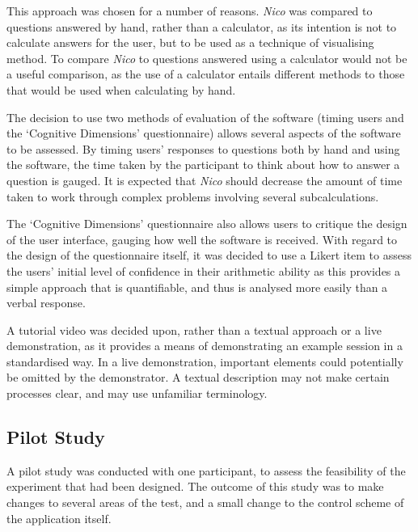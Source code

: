 \documentclass[12pt,twoside,notitlepage,xetex]{report}
\begin{document}
This approach was chosen for a number of reasons.  \emph{Nico} was compared to questions answered by hand, rather than a calculator, as its intention is not to calculate answers for the user, but to be used as a technique of visualising method.  To compare \emph{Nico} to questions answered using a calculator would not be a useful comparison, as the use of a calculator entails different methods to those that would be used when calculating by hand.

The decision to use two methods of evaluation of the software (timing users and the `Cognitive Dimensions' questionnaire) allows several aspects of the software to be assessed.  By timing users' responses to questions both by hand and using the software, the time taken by the participant to think about how to answer a question is gauged.  It is expected that \emph{Nico} should decrease the amount of time taken to work through complex problems involving several subcalculations.

The `Cognitive Dimensions' questionnaire also allows users to critique the design of the user interface, gauging how well the software is received.  With regard to the design of the questionnaire itself, it was decided to use a Likert item to assess the users' initial level of confidence in their arithmetic ability as this provides a simple approach that is quantifiable, and thus is analysed more easily than a verbal response.

A tutorial video was decided upon, rather than a textual approach or a live demonstration, as it provides a means of demonstrating an example session in a standardised way.  In a live demonstration, important elements could potentially be omitted by the demonstrator.  A textual description may not make certain processes clear, and may use unfamiliar terminology.

\subsection{Pilot Study}

A pilot study was conducted with one participant, to assess the feasibility of the experiment that had been designed.  The outcome of this study was to make changes to several areas of the test, and a small change to the control scheme of the application itself.
\end{document}

